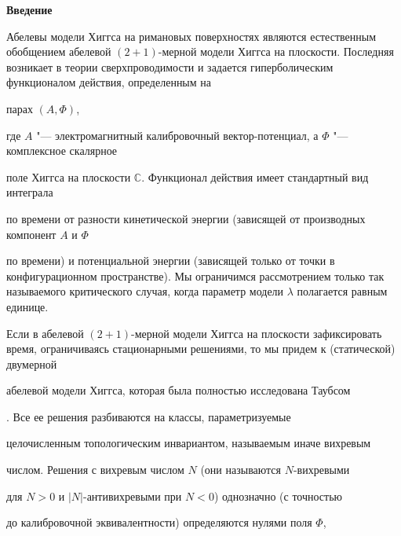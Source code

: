 \date{16/XII/2014} %








\renewcommand{\baselinestretch}{0.88}



\makerutitle



\textbf{Введение}



Абелевы модели Хиггса на римановых поверхностях являются естественным обобщением абелевой $(2+1)$-мерной модели Хиггса на плоскости. Последняя возникает в теории сверхпроводимости и  задается гиперболическим функционалом действия, определенным на 

парах $(A,\Phi)$,

где $A$ "---  электромагнитный калибровочный вектор-потенциал, а $\Phi$ "---  комплексное скалярное

поле Хиггса на плоскости $\mathbb C$. Функционал действия имеет стандартный вид интеграла

по времени от разности кинетической энергии (зависящей от производных компонент $A$ и $\Phi$ 

по времени) и потенциальной энергии (зависящей только от точки в конфигурационном пространстве). Мы ограничимся рассмотрением только так называемого критического случая, когда параметр модели $\lambda$ полагается равным единице.



 Если в абелевой $(2+1)$-мерной модели Хиггса на плоскости зафиксировать время, ограничиваясь стационарными решениями, то мы придем к (статической) двумерной

абелевой модели Хиггса, которая была полностью исследована Таубсом

\cite{palv:jt}. Все ее решения разбиваются на классы, параметризуемые

целочисленным топологическим инвариантом, называемым иначе вихревым

числом. Решения с вихревым числом $N$ (они называются $N$-вихревыми

для $N>0$ и $|N|$-антивихревыми при $N<0$) однозначно (с точностью

до калибровочной эквивалентности) определяются нулями поля $\Phi$,

